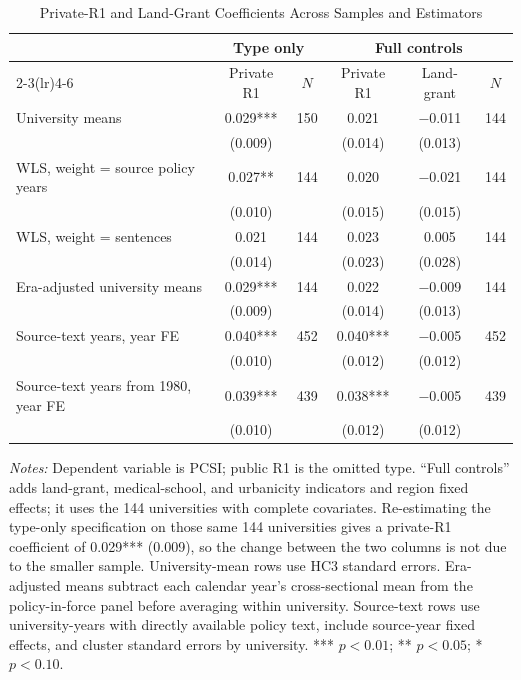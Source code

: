 \begin{table}[htbp]
\centering
\small
\caption{Private-R1 and Land-Grant Coefficients Across Samples and Estimators}
\label{tab:inst-robust}
\begin{threeparttable}
\begin{tabular}{lccccc}
\toprule
 & \multicolumn{2}{c}{Type only} & \multicolumn{3}{c}{Full controls} \\
\cmidrule(lr){2-3}\cmidrule(lr){4-6}
 & Private R1 & $N$ & Private R1 & Land-grant & $N$ \\
\midrule
University means & 0.029*** & 150 & 0.021 & $-$0.011 & 144 \\
 & (0.009) & & (0.014) & (0.013) & \\
WLS, weight = source policy years & 0.027** & 144 & 0.020 & $-$0.021 & 144 \\
 & (0.010) & & (0.015) & (0.015) & \\
WLS, weight = sentences & 0.021 & 144 & 0.023 & 0.005 & 144 \\
 & (0.014) & & (0.023) & (0.028) & \\
Era-adjusted university means & 0.029*** & 144 & 0.022 & $-$0.009 & 144 \\
 & (0.009) & & (0.014) & (0.013) & \\
Source-text years, year FE & 0.040*** & 452 & 0.040*** & $-$0.005 & 452 \\
 & (0.010) & & (0.012) & (0.012) & \\
Source-text years from 1980, year FE & 0.039*** & 439 & 0.038*** & $-$0.005 & 439 \\
 & (0.010) & & (0.012) & (0.012) & \\
\bottomrule
\end{tabular}
\begin{tablenotes}[flushleft]\footnotesize
\item \textit{Notes:} Dependent variable is PCSI; public R1 is the omitted type. ``Full controls'' adds land-grant, medical-school, and urbanicity indicators and region fixed effects; it uses the 144 universities with complete covariates. Re-estimating the type-only specification on those same 144 universities gives a private-R1 coefficient of 0.029*** (0.009), so the change between the two columns is not due to the smaller sample. University-mean rows use HC3 standard errors. Era-adjusted means subtract each calendar year's cross-sectional mean from the policy-in-force panel before averaging within university. Source-text rows use university-years with directly available policy text, include source-year fixed effects, and cluster standard errors by university. *** $p<0.01$; ** $p<0.05$; * $p<0.10$.
\end{tablenotes}
\end{threeparttable}
\end{table}
